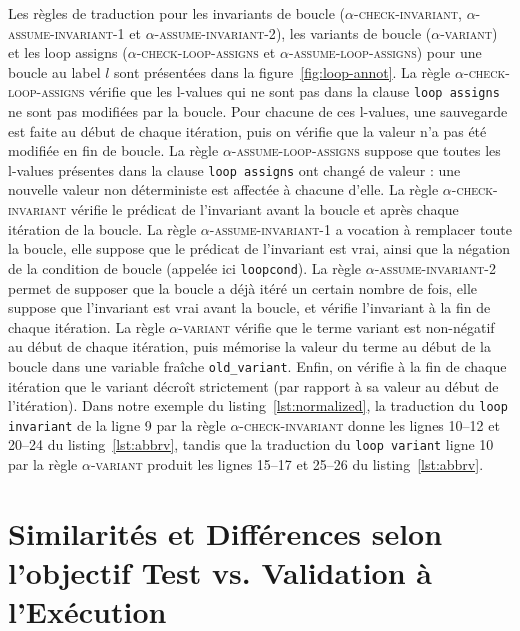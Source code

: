Les règles de traduction pour les invariants de boucle
(\textsc{$\alpha$-check-invariant}, \textsc{$\alpha$-assume-invariant-1} et
\textsc{$\alpha$-assume-invariant-2}), les variants de boucle
(\textsc{$\alpha$-variant}) et les loop assigns
(\textsc{$\alpha$-check-loop-assigns} et \textsc{$\alpha$-assume-loop-assigns})
pour une boucle au label $l$ sont présentées dans la
figure~\ref{fig:loop-annot}.
La règle \textsc{$\alpha$-check-loop-assigns} vérifie que les l-values qui ne
sont pas dans la clause \lstinline'loop assigns' ne sont pas modifiées par la
boucle. Pour chacune de ces l-values, une sauvegarde est faite au début de
chaque itération, puis on vérifie que la valeur n'a pas été modifiée en fin de
boucle.
La règle \textsc{$\alpha$-assume-loop-assigns} suppose que toutes les l-values
présentes dans la clause \lstinline'loop assigns' ont changé de valeur : une
nouvelle valeur non déterministe est affectée à chacune d'elle.
La règle \textsc{$\alpha$-check-invariant} vérifie le prédicat de l'invariant
avant la boucle et après chaque itération de la boucle.
La règle \textsc{$\alpha$-assume-invariant-1} a vocation à remplacer toute la
boucle, elle suppose que le prédicat de l'invariant est vrai, ainsi que la
négation de la condition de boucle (appelée ici \lstinline'loopcond').
La règle \textsc{$\alpha$-assume-invariant-2} permet de supposer que la boucle
a déjà itéré un certain nombre de fois, elle suppose que l'invariant est vrai
avant la boucle, et vérifie l'invariant à la fin de chaque itération.
La règle \textsc{$\alpha$-variant} vérifie que le terme variant est non-négatif
au début de chaque itération, puis mémorise la valeur du terme au début de la
boucle dans une variable fraîche \lstinline|old_variant|. Enfin, on vérifie à la
fin de chaque itération que le variant décroît strictement (par rapport à sa
valeur au début de l'itération).
Dans notre exemple du listing~\ref{lst:normalized}, la traduction du
\lstinline'loop invariant' de la ligne 9 par la règle
\textsc{$\alpha$-check-invariant} donne les lignes 10--12 et 20--24 du
listing~\ref{lst:abbrv}, tandis que la traduction du \lstinline'loop variant'
ligne 10 par la règle \textsc{$\alpha$-variant} produit les lignes 15--17 et
25--26 du listing~\ref{lst:abbrv}.


\section[Test vs. Validation à l'Exécution]{Similarités et Différences selon
  l'objectif Test vs. Validation à l'Exécution}


